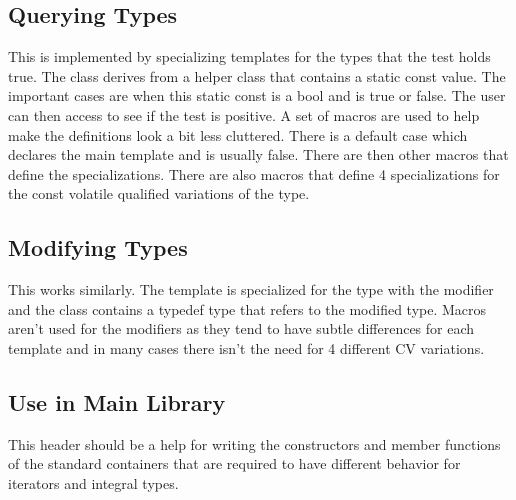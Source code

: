 \subsection{Querying Types}

This is implemented by specializing templates for the types that the test
holds true. The class derives from a helper class that contains a static const
value. The important cases are when this static const is a bool and is true or
false. The user can then access  to see if the test
is positive. A set of macros are used to help make the definitions look a bit
less cluttered. There is a default case which declares the main template and
is usually false. There are then other macros that define the specializations.
There are also macros that define 4 specializations for the const volatile
qualified variations of the type.

\subsection{Modifying Types}

This works similarly. The template is specialized for the type with the
modifier and the class contains a typedef type that refers to the modified
type. Macros aren't used for the modifiers as they tend to have subtle
differences for each template and in many cases there isn't the need for 4
different CV variations.

\subsection{Use in Main Library}

This header should be a help for writing the constructors and member functions
of the standard containers that are required to have different behavior for
iterators and integral types.

